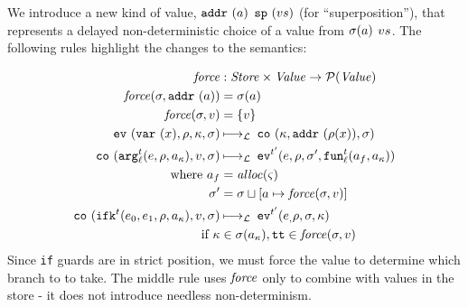 \documentclass[preprint,onecolumn,9pt]{sigplanconf} %
\begin{document}
We introduce a new kind of value,
\spchoice
{${\tt addr}{\ }({a})$}
{${\tt sp}{\ }({v{s}})$ (for ``superposition'')},
%
that represents a delayed non-deterministic choice of a value from
\spchoice
{$\sigma(a)$}
{$v{s}$}.
%
The following rules highlight the changes to the semantics:

\renewcommand{\ext}{\mathit{ext}}
{\small
\begin{align*}
\spchoice
{\force &: \Store \times \Value \to \Set(\Value) \\
 \force(\msto,\saddr{\maddr}) &= \msto(\maddr) \\
 \force(\msto,\mval) &= \setof{\mval}}
{\force &: \Value \to \Set(\Value) \\
 \force(\superposition{\mval{s}}) &= \mval{s} \\
 \force(\mval) &= \{\mval\}}
\\
%
\ev{\svar{\mvar},\menv,\mkont,\msto} &\lmachstep\;
\spchoice
{\co{\mkont,\saddr{\menv(\mvar)},\msto}}
{\co{\mkont,\superposition{\msto(\menv(\mvar))},\msto}} \\
%
\co{\kar[^\mcntr_\mlab]{\mexp,\menv,\mkaddr},\mval,\msto}
&\lmachstep\;
\ev[^{\mcntr'}]{\mexp,\menv,\msto',\kfn[^\mcntr_\mlab]{\maddr_f,\mkaddr}} \\
\text{ where }
\maddr_f &= \alloc(\mstate) \\
\msto' &=
\spchoice
{\msto \sqcup[\maddr \mapsto \force(\msto,\mval)]}
{\msto \sqcup[\maddr \mapsto \force(\mval)]} \\
%
\co{\kif[^\mcntr]{\mexpi0,\mexpi1,\menv,\mkaddr},\mval,\msto}
&\lmachstep\;
\ev[^{\mcntr'}]{\mexpi,\menv,\msto,\mkont} \\
\text{ if } \mkont &\in \msto(\mkaddr),
            \strue \in \spchoice{\force(\msto,\mval)}{\force(\mval)}
\end{align*}}
Since {\tt if} guards are in strict position, we must force the value
to determine which branch to to take. The middle rule uses $\mathit{force}$
only to combine with values in the store - it does not introduce
needless non-determinism.
\end{document}
